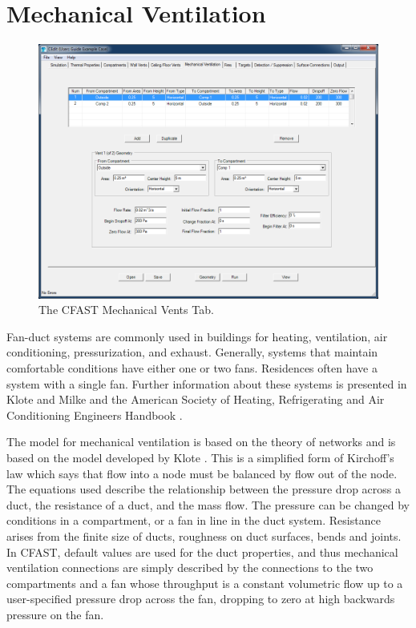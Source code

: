 \chapter{Mechanical Ventilation}

\begin{figure}[h!]
\begin{center}
\includegraphics[width=6.5in]{FIGURES/Mechanical_Vent_Tab}
\caption[The CFAST Mechanical Vents Tab]{The CFAST Mechanical Vents Tab.}
\end{center}
\end{figure}

Fan-duct systems are commonly used in buildings for heating, ventilation, air conditioning, pressurization, and exhaust. Generally, systems that maintain comfortable conditions have either one or two fans.  Residences often have a system with a single fan. Further information about these systems is presented in  Klote and Milke \cite{Klote:2002} and the American Society of Heating, Refrigerating and Air Conditioning Engineers Handbook \cite{ASHRAE:2001}.

The model for mechanical ventilation is based on the theory of networks and is based on the model developed by Klote \cite{Klote:1988a}.  This is a simplified form of Kirchoff's law which says that flow into a node must be balanced by flow out of the node. The equations used describe the relationship between the pressure drop across a duct, the resistance of a duct, and the mass flow.  The pressure can be changed by conditions in a compartment, or a fan in line in the duct system.  Resistance arises from the finite size of ducts, roughness on duct surfaces, bends and joints. In CFAST, default values are used for the duct properties, and thus mechanical ventilation connections are simply described by the connections to the two compartments and a fan whose throughput is a constant volumetric flow up to a user-specified pressure drop across the fan, dropping to zero at high backwards pressure on the fan.

